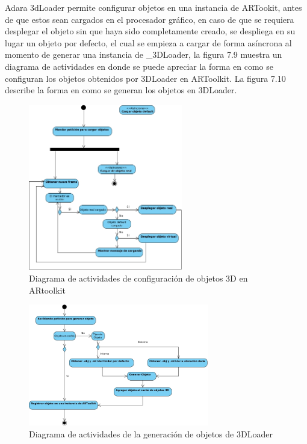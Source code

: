 \documentclass[12pt,a4paper,spanish,openany]{book}
\begin{document}
Adara 3dLoader permite configurar objetos en una instancia de ARTookit, antes de
que estos sean cargados en el procesador gráfico, en caso de que se requiera
desplegar el objeto sin que haya sido completamente creado, se despliega en su
lugar un objeto por defecto, el cual se empieza a cargar de forma asíncrona al
momento de generar una instancia de \_3DLoader, la figura 7.9 muestra un
diagrama de actividades en donde se puede apreciar la forma en como se configuran los
objetos obtenidos por 3DLoader en ARToolkit. La figura 7.10 describe la forma en
como se generan los objetos en 3DLoader.

\begin{figure}[ht]
\begin{center}
 \includegraphics[width=0.6\textwidth]{./img/activityLoader1.jpg}
 \caption{Diagrama de actividades de configuración de objetos 3D en ARtoolkit}
\end{center}
\end{figure}

\begin{figure}[ht]
\begin{center}
 \includegraphics[width=0.7\textwidth]{./img/activityLoader2.jpg}
 \caption{Diagrama de actividades de la generación de objetos de 3DLoader}
\end{center}
\end{figure}
\end{document}
